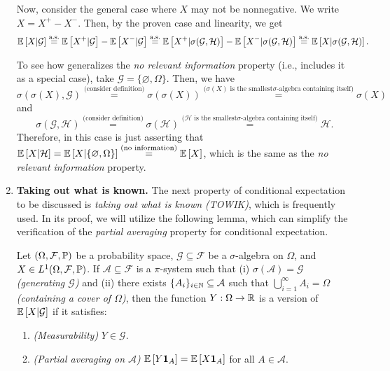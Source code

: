 \begin{enumerate}
\begin{pf}
Now, consider the general case where \(X\) may not be nonnegative. We write
\(X=X^{+}-X^{-}\). Then, by the proven case and linearity, we get
\[
\mathbb{E}\left[X|\mathcal{G}\right]\overset{\text{a.s.}}= \mathbb{E}\left[X^{+}|\mathcal{G}\right]-\mathbb{E}\left[X^{-}|\mathcal{G}\right]
\overset{\text{a.s.}}=\mathbb{E}\left[X^{+}|\sigma(\mathcal{G},\mathcal{H})\right]
-\mathbb{E}\left[X^{-}|\sigma(\mathcal{G},\mathcal{H})\right]
\overset{\text{a.s.}}=\mathbb{E}\left[X|\sigma(\mathcal{G},\mathcal{H})\right].
\]
\end{pf}

To see how  generalizes the \emph{no
relevant information} property (i.e., includes it as a special case), take
\(\mathcal{G}=\{\varnothing,\Omega\}\). Then, we have
\[\sigma(\sigma(X),\mathcal{G})\overset{\text{(consider
definition)}}{=}\sigma(\sigma(X))\overset{\text{(\(\sigma(X)\) is the smallest
\(\sigma\)-algebra containing itself)}}{=}\sigma(X)\]
and 
\[\sigma(\mathcal{G},\mathcal{H})\overset{\text{(consider
definition)}}{=}\sigma(\mathcal{H})\overset{\text{(\(\mathcal{H}\) is the smallest
\(\sigma\)-algebra containing itself)}}{=}\mathcal{H}.\]
Therefore, in this case  is just
asserting that
\(\mathbb{E}\left[X|\mathcal{H}\right]=\mathbb{E}\left[X|\{\varnothing,\Omega\}\right]\overset{\text{(no
information)}}{=}\mathbb{E}\left[X\right]\), which is the same as the \emph{no relevant
information} property.
\item \textbf{Taking out what is known.} The next property of conditional
expectation to be discussed is \emph{taking out what is known (TOWIK)}, which
is frequently used. In its proof, we will utilize the following lemma, which
can simplify the verification of the \emph{partial averaging} property for
conditional expectation.
\begin{lemma}
\label{lma:part-avg-on-pi-sys}
Let \((\Omega,\mathcal{F},\mathbb{P})\) be a probability space, \(\mathcal{G}\subseteq
\mathcal{F}\) be a \(\sigma\)-algebra on \(\Omega\), and \(X\in
L^{1}(\Omega,\mathcal{F},\mathbb{P})\). If \(\mathcal{A}\subseteq \mathcal{F}\) is a
\(\pi\)-system such that (i) \(\sigma(\mathcal{A})=\mathcal{G}\)
\emph{(generating \(\mathcal{G}\))} and (ii) there exists
\(\{A_i\}_{i\in\mathbb{N}}\subseteq \mathcal{A}\) such that
\(\bigcup_{i=1}^{\infty}A_i=\Omega\) \emph{(containing a cover of \(\Omega\))},
then the function \(Y:\Omega\to\mathbb{R}\) is a version of \(\mathbb{E}\left[X|\mathcal{G}\right]\) if
it satisfies:
\begin{enumerate}[label={(\arabic*)}]
\item \emph{(Measurability)} \(Y\in\mathcal{G}\).
\item \emph{(Partial averaging on \(\mathcal{A}\))}
\(\mathbb{E}\left[Y\mathbf{1}_{A}\right]=\mathbb{E}\left[X\mathbf{1}_{A}\right]\) for all \(A\in\mathcal{A}\).

\end{enumerate}
\end{lemma}
\end{enumerate}
